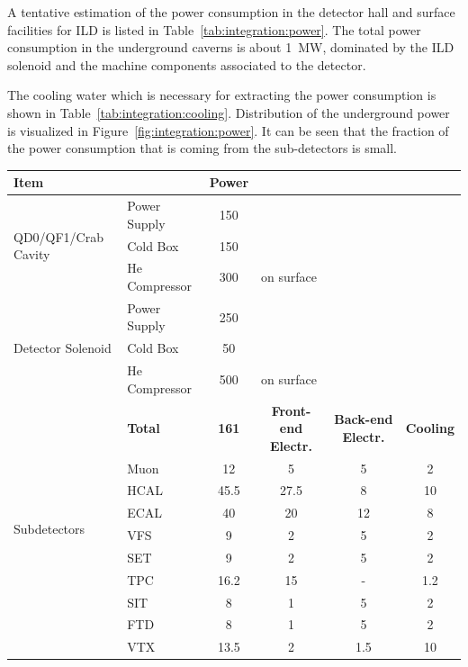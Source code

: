 A tentative estimation of the power consumption in the detector hall and surface facilities for ILD is listed in Table~\ref{tab:integration:power}. The total power consumption in the underground caverns is about 1~MW, dominated by the ILD solenoid and the machine components associated to the detector. 

The cooling water which is necessary for extracting the power consumption is shown in Table~\ref{tab:integration:cooling}.
Distribution of the underground power is visualized in Figure~\ref{fig:integration:power}. It can be seen that the fraction of the power consumption that is coming from the sub-detectors is small.

\begin{table}[htb]
    \centering
    \begin{tabular}{l|l|c|c|c|c}
       \multicolumn{2}{l|}{{\bf Item}} & {\bf Power} &\multicolumn{3}{c}{ } \\ \hline
        \multirow{3}{*}{QD0/QF1/Crab Cavity} & Power Supply  & 150 & \multicolumn{3}{l}{ } \\
                            & Cold Box      & 150 & \multicolumn{3}{l}{ } \\
                            & He Compressor & 300 & \multicolumn{3}{l}{on surface}\\ \hline
        \multirow{3}{*}{Detector Solenoid} & Power Supply  & 250 & \multicolumn{3}{l}{ } \\
                            & Cold Box      & 50 & \multicolumn{3}{l}{ } \\
                            & He Compressor & 500 & \multicolumn{3}{l}{on surface}\\ \hline                      
        \multirow{10}{*}{Subdetectors} & {\bf Total}  & {\bf 161} & {\bf Front-end Electr.} & {\bf Back-end Electr.} & {\bf Cooling}\\ \cline{2-6}
        & Muon  & 12 & 5 & 5  & 2 \\
        & HCAL  & 45.5 & 27.5 & 8 & 10 \\
        & ECAL  & 40 & 20 & 12 & 8 \\
        & VFS   & 9 & 2 & 5 & 2 \\
        & SET   & 9 & 2 & 5 & 2 \\
        & TPC   & 16.2 & 15 & - & 1.2 \\
        & SIT   & 8 & 1 & 5 & 2 \\
        & FTD   & 8 & 1 & 5 & 2 \\
        & VTX   & 13.5 & 2 & 1.5 & 10 \\\hline

\end{tabular}
\end{table}
